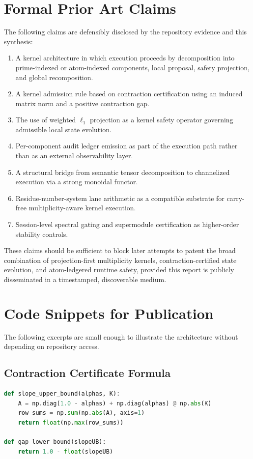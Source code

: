 \documentclass[11pt]{article}
\begin{document}
\section{Formal Prior Art Claims}
The following claims are defensibly disclosed by the repository evidence and this synthesis:
\begin{enumerate}[leftmargin=2em]
    \item A kernel architecture in which execution proceeds by decomposition into prime-indexed or atom-indexed components, local proposal, safety projection, and global recomposition.
    \item A kernel admission rule based on contraction certification using an induced matrix norm and a positive contraction gap.
    \item The use of weighted $\ell_1$ projection as a kernel safety operator governing admissible local state evolution.
    \item Per-component audit ledger emission as part of the execution path rather than as an external observability layer.
    \item A structural bridge from semantic tensor decomposition to channelized execution via a strong monoidal functor.
    \item Residue-number-system lane arithmetic as a compatible substrate for carry-free multiplicity-aware kernel execution.
    \item Session-level spectral gating and supermodule certification as higher-order stability controls.
\end{enumerate}

These claims should be sufficient to block later attempts to patent the broad combination of projection-first multiplicity kernels, contraction-certified state evolution, and atom-ledgered runtime safety, provided this report is publicly disseminated in a timestamped, discoverable medium.

\section{Code Snippets for Publication}
The following excerpts are small enough to illustrate the architecture without depending on repository access.

\subsection{Contraction Certificate Formula}
\begin{lstlisting}[language=Python]
def slope_upper_bound(alphas, K):
    A = np.diag(1.0 - alphas) + np.diag(alphas) @ np.abs(K)
    row_sums = np.sum(np.abs(A), axis=1)
    return float(np.max(row_sums))

def gap_lower_bound(slopeUB):
    return 1.0 - float(slopeUB)
\end{lstlisting}
\end{document}

